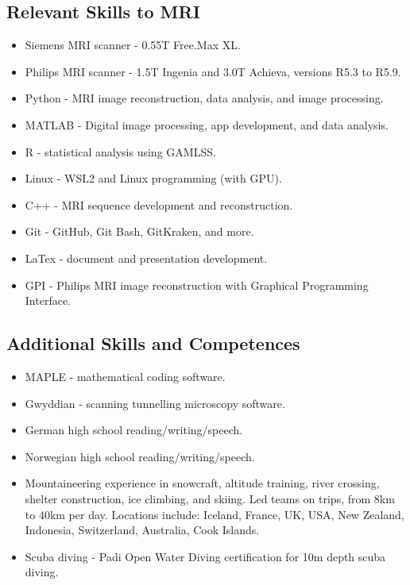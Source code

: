 \documentclass[12pt,]{scrartcl}
\begin{document}
\subsection{Relevant Skills to MRI}\label{relevant-skills}
\begin{itemize}
  \leftskip-0.25in
    \item Siemens MRI scanner - 0.55T Free.Max XL.
    \item Philips MRI scanner - 1.5T Ingenia and 3.0T Achieva, versions R5.3 to R5.9.
    \item Python - MRI image reconstruction, data analysis, and image processing.
    \item MATLAB - Digital image processing, app development, and data analysis.
    \item R - statistical analysis using GAMLSS.
    \item Linux - WSL2 and Linux programming (with GPU).
    \item C++ - MRI sequence development and reconstruction.
    \item Git - GitHub, Git Bash, GitKraken, and more.
    \item LaTex - document and presentation development.
    \item GPI - Philips MRI image reconstruction with Graphical Programming Interface.

\end{itemize}

\subsection{Additional Skills and Competences}\label{additional-skills-competences}
\begin{itemize}
  \leftskip-0.25in
    \item MAPLE - mathematical coding software.
    \item Gwyddian - scanning tunnelling microscopy software.
    \item German high school reading/writing/speech. 
    \item Norwegian high school reading/writing/speech. 
    \item Mountaineering experience in snowcraft, altitude training, river crossing, shelter construction, ice climbing, and skiing. Led teams on trips, from 8km to 40km per day. Locations include: Iceland, France, UK, USA, New Zealand, Indonesia, Switzerland, Australia, Cook Islands.
    \item Scuba diving - Padi Open Water Diving certification for 10m depth scuba diving. 

\end{itemize}
\end{document}
